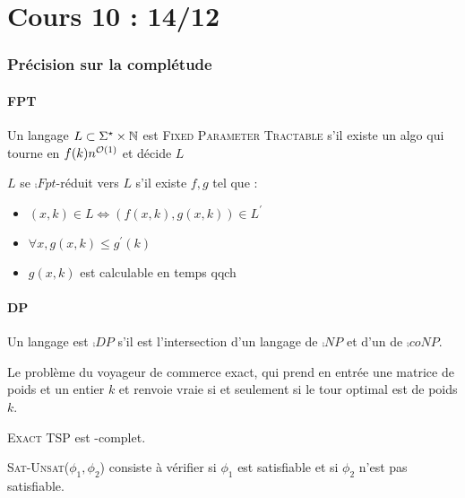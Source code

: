 \documentclass{cours}
\begin{document}
\part[Précisions sur la Complétude]{Cours 10 : 14/12}
\section{Précision sur la complétude}
\subsection{FPT}
\begin{definition}
    Un langage $L \subset \Sigma^{\star} \times \mathbb{N}$ est \textsc{Fixed Parameter Tractable} s'il existe un algo qui tourne en $f(k)n^{\mathcal{O}(1)}$ et décide $L$
\end{definition}

\begin{definition}
    $L$ se $\comp{Fpt}$-réduit vers $L$ s'il existe $f, g$ tel que : 
    \begin{itemize}
        \item $(x, k) \in L \Leftrightarrow \left(f(x, k), g(x, k)\right) \in L^{'}$
        \item $\forall x, g(x, k) \leq g^{'}(k)$
        \item $g(x, k)$ est calculable en temps qqch
    \end{itemize}
\end{definition}

\subsection{DP}
\begin{definition}
    Un langage est $\comp{DP}$ s'il est l'intersection d'un langage de $\comp{NP}$ et d'un de $\comp{coNP}$.
\end{definition}

\begin{definition}
    Le problème du voyageur de commerce exact, qui prend en entrée une matrice de poids et un entier $k$ et renvoie vraie si et seulement si le tour optimal est de poids $k$. 
\end{definition}

\begin{proposition}
    \textsc{Exact TSP} est -complet. 
\end{proposition}

\begin{definition}
    \textsc{Sat-Unsat}($\phi_{1}, \phi_{2}$) consiste à vérifier si $\phi_{1}$ est satisfiable et si $\phi_{2}$ n'est pas satisfiable. 
\end{definition}
\end{document}
